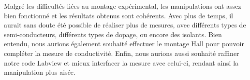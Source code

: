 Malgré les difficultés liées au montage expérimental, les manipulations ont assez bien fonctionné et les résultats obtenus sont cohérents.
Avec plus de temps, il aurait sans doute été possible de réaliser plus de mesures, avec différents types de semi-conducteurs, différents types de dopage, ou encore des isolants.
Bien entendu, nous aurions également souhaité effectuer le montage Hall pour pouvoir compléter la mesure de conductivité.
Enfin, nous aurions aussi souhaité raffiner notre code Labview et mieux interfacer la mesure avec celui-ci, rendant ainsi la manipulation plus aisée.
